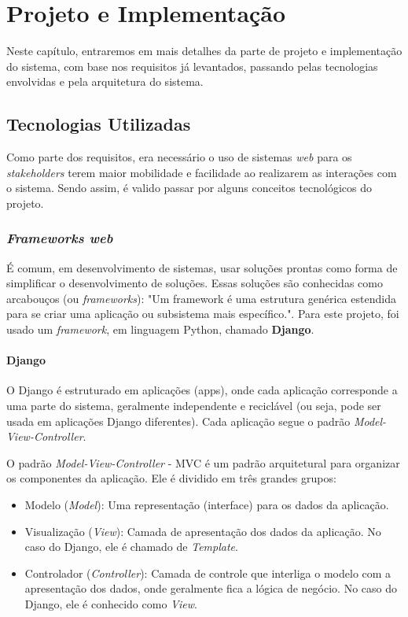 \chapter{Projeto e Implementação}
Neste capítulo, entraremos em mais detalhes da parte de projeto e implementação do sistema, com base nos requisitos já levantados, passando pelas tecnologias envolvidas e pela arquitetura do sistema.

\section{Tecnologias Utilizadas}
Como parte dos requisitos, era necessário o uso de sistemas \textit{web} para os \textit{stakeholders} terem maior mobilidade e facilidade ao realizarem as interações com o sistema. Sendo assim, é valido passar por alguns conceitos tecnológicos do projeto.

\subsection{\textit{Frameworks web}}

É comum, em desenvolvimento de sistemas, usar soluções prontas como forma de simplificar o desenvolvimento de soluções. Essas soluções são conhecidas como arcabouços (ou \textit{frameworks})\cite{iansommerville2011}: "Um framework é uma estrutura genérica estendida para se criar uma aplicação ou subsistema mais específico.". Para este projeto, foi usado um \textit{framework}, em linguagem Python, chamado \textbf{Django}.

\subsubsection{Django}
O Django é estruturado em aplicações (apps), onde cada aplicação corresponde a uma parte do sistema, geralmente independente e reciclável (ou seja, pode ser usada em aplicações Django diferentes). Cada aplicação segue o padrão \textit{Model-View-Controller}.

O padrão \textit{Model-View-Controller} - MVC é um padrão arquitetural para organizar os componentes da aplicação. Ele é dividido em três grandes grupos\cite{thedjangobook2018}:

\begin{itemize}
    \item Modelo (\textit{Model}): Uma representação (interface) para os dados da aplicação.
    \item Visualização (\textit{View}): Camada de apresentação dos dados da aplicação. No caso do Django, ele é chamado de \textit{Template}.
    \item Controlador (\textit{Controller}): Camada de controle que interliga o modelo com a apresentação dos dados, onde geralmente fica a lógica de negócio. No caso do Django, ele é conhecido como \textit{View}.
\end{itemize}

